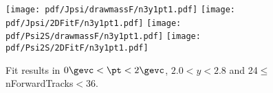 \begin{figure}[H]
\begin{center}
\texttt{[image: pdf/Jpsi/drawmassF/n3y1pt1.pdf]}
\texttt{[image: pdf/Jpsi/2DFitF/n3y1pt1.pdf]}
\vspace*{-0.5cm}
\texttt{[image: pdf/Psi2S/drawmassF/n3y1pt1.pdf]}
\texttt{[image: pdf/Psi2S/2DFitF/n3y1pt1.pdf]}
\vspace*{-0.5cm}
\end{center}
\caption{Fit results in $0\gevc<\pt<2\gevc$, $2.0<y<2.8$ and 24$\leq$nForwardTracks$<$36.}
\label{Fitn3y1pt1}
\end{figure}
